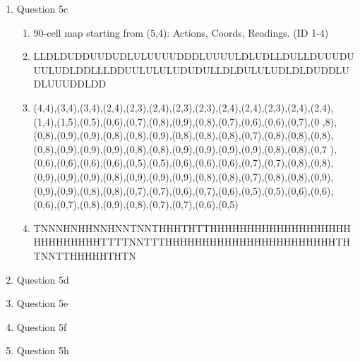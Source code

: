 \documentclass[11pt]{article}
\begin{document}
\begin{enumerate}
\item Question 5c
\begin{enumerate}
\item 90-cell map starting from (5,4): Actions, Coords, Readings. (ID 1-4)
\item LLDLDUDDUUDUDLULUUUUDDDLUUUULDLUDLLDULLDUUUDUUULUDLDDLLLDDUULULULUDUDULLDLDULULUDLDLDUDDLUDLUUUDDLDD
\item (4,4),(3,4),(3,4),(2,4),(2,3),(2,4),(2,3),(2,3),(2,4),(2,4),(2,3),(2,4),(2,4),(1,4),(1,5),(0,5),(0,6),(0,7),(0,8),(0,9),(0,8),(0,7),(0,6),(0,6),(0,7),(0
,8),(0,8),(0,9),(0,9),(0,8),(0,8),(0,9),(0,8),(0,8),(0,8),(0,7),(0,8),(0,8),(0,8),(0,8),(0,9),(0,9),(0,9),(0,8),(0,8),(0,9),(0,9),(0,9),(0,9),(0,8),(0,8),(0,7
),(0,6),(0,6),(0,6),(0,6),(0,5),(0,5),(0,6),(0,6),(0,6),(0,7),(0,7),(0,8),(0,8),(0,9),(0,9),(0,9),(0,8),(0,9),(0,9),(0,9),(0,8),(0,8),(0,7),(0,8),(0,8),(0,9),
(0,9),(0,9),(0,8),(0,8),(0,7),(0,7),(0,6),(0,7),(0,6),(0,5),(0,5),(0,6),(0,6),(0,6),(0,7),(0,8),(0,9),(0,8),(0,7),(0,7),(0,6),(0,5)
\item TNNNHNHHNNHNNTNNTHHHTHTTHHHHHHHHHHHHHHHHHHHHHHHHHHHHTTTTNNTTTHHHHHHHHHHHHHHHHHHHHHHHTHTNNTTHHHHHTHTN
\end{enumerate}

\item Question 5d

\item Question 5e

\item Question 5f

\item Question 5h

\end{enumerate}
\end{document}
